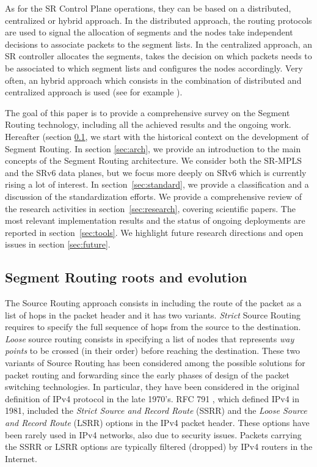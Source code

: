 As for the SR Control Plane operations, they can be based on a distributed, centralized or hybrid approach. In the distributed approach, the routing protocols are used to signal the allocation of segments and the nodes take independent decisions to associate packets to the segment lists. In the centralized approach, an SR controller allocates the segments, takes the decision on which packets needs to be associated to which segment lists and configures the nodes accordingly. Very often, an hybrid approach which consists in the combination of distributed and centralized approach is used (see for example \cite{ventre2018sdn}). 

The goal of this paper is to provide a comprehensive survey on the Segment Routing technology, including all the achieved results and the ongoing work. Hereafter (section \ref{sec:sr-evolution}, we start with the historical context on the development of Segment Routing. In section \ref{sec:arch}, we provide an introduction to the main concepts of the Segment Routing architecture. We consider both the SR-MPLS and the SRv6 data planes, but we focus more deeply on SRv6 which is currently rising a lot of interest. In section~\ref{sec:standard}, we provide a classification and a discussion of the standardization efforts. We provide a comprehensive review of the research activities in section~\ref{sec:research}, covering \numTotalPapers scientific papers. The most relevant implementation results and the status of ongoing deployments are reported in section~\ref{sec:tools}. We highlight future research directions and open issues in section \ref{sec:future}.  

\subsection{Segment Routing roots and evolution}
\label{sec:sr-evolution}

The Source Routing approach consists in including the route of the packet as a list of hops in the packet header and it has two variants. \textit{Strict} Source Routing requires to specify the full sequence of hops from the source to the destination. \textit{Loose} source routing consists in specifying a list of nodes that represents \textit{way points} to be crossed (in their order) before reaching the destination. These two variants of Source Routing has been considered among the possible solutions for packet routing and forwarding since the early phases of design of the packet switching technologies. In particular, they have been considered in the original definition of IPv4 protocol in the late 1970's. RFC 791 \cite{rfc791}, which defined IPv4 in 1981, included the \textit{Strict Source and Record Route} (SSRR) and the \textit{Loose Source and Record Route} (LSRR) options in the IPv4 packet header. These options have been rarely used in IPv4 networks, also due to security issues. Packets carrying the SSRR or LSRR options are typically filtered (dropped) by IPv4 routers in the Internet.

